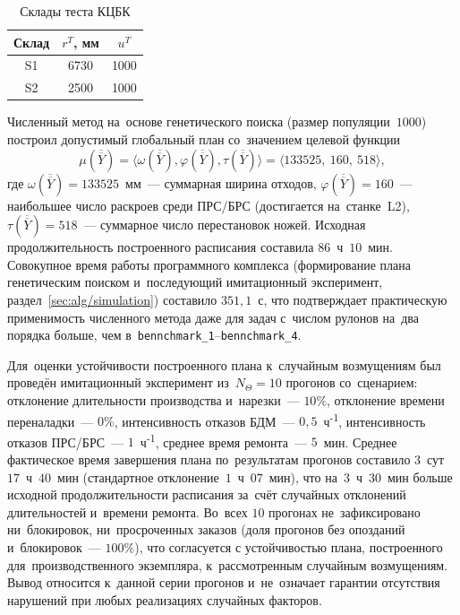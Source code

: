 \begin{table}[h]
\centering
\caption{Склады теста КЦБК}
\label{tab:ktsbk_storages}
\begin{tabular}{|c|c|c|}
\hline
Склад & ${r^T}$, мм & ${u^T}$ \\
\hline
S1 & 6730 & 1000 \\
S2 & 2500 & 1000 \\
\hline
\end{tabular}
\end{table}

Численный метод на~основе генетического поиска (размер популяции~$1000$) построил допустимый глобальный план со~значением целевой функции
\[
\mu(\overline{\overline{Y}}) = \langle \omega(\overline{\overline{Y}}),\varphi(\overline{\overline{Y}}),\tau(\overline{\overline{Y}}) \rangle = \langle 133525,\ 160,\ 518 \rangle,
\]
где $\omega(\overline{\overline{Y}})=133525$~мм~--- суммарная ширина отходов, $\varphi(\overline{\overline{Y}})=160$~--- наибольшее число раскроев среди ПРС/БРС (достигается на~станке~L2), $\tau(\overline{\overline{Y}})=518$~--- суммарное число перестановок ножей.
Исходная продолжительность построенного расписания составила $86$~ч~$10$~мин.
Совокупное время работы программного комплекса (формирование плана генетическим поиском и~последующий имитационный эксперимент, раздел~\ref{sec:alg/simulation}) составило $351{,}1$~с, что подтверждает практическую применимость численного метода даже для задач с~числом рулонов на~два порядка больше, чем в~\texttt{bennchmark\_1}--\texttt{bennchmark\_4}.

Для~оценки устойчивости построенного плана к~случайным возмущениям был проведён имитационный эксперимент из~$N_{\Theta}=10$ прогонов со~сценарием: отклонение длительности производства и~нарезки~--- $10\%$, отклонение времени переналадки~--- $0\%$, интенсивность отказов БДМ~--- $0{,}5$~ч\textsuperscript{-1}, интенсивность отказов ПРС/БРС~--- $1$~ч\textsuperscript{-1}, среднее время ремонта~--- $5$~мин.
Среднее фактическое время завершения плана по~результатам прогонов составило $3$~сут~$17$~ч~$40$~мин (стандартное отклонение~$1$~ч~$07$~мин), что на~$3$~ч~$30$~мин больше исходной продолжительности расписания за~счёт случайных отклонений длительностей и~времени ремонта.
Во~всех $10$ прогонах не~зафиксировано ни~блокировок, ни~просроченных заказов (доля прогонов без опозданий и~блокировок~--- $100\%$), что согласуется с устойчивостью плана, построенного для~производственного экземпляра, к~рассмотренным случайным возмущениям. Вывод относится к~данной серии прогонов и~не~означает гарантии отсутствия нарушений при любых реализациях случайных факторов.


